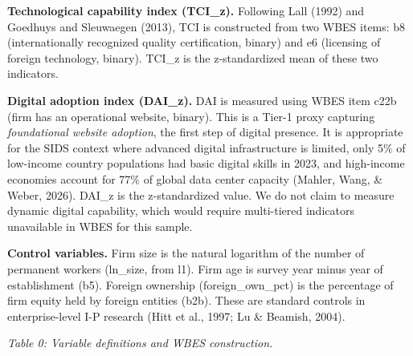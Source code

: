 \documentclass[
  12pt]{article}
\begin{document}
\textbf{Technological capability index (TCI\_z).} Following Lall (1992)
and Goedhuys and Sleuwaegen (2013), TCI is constructed from two WBES
items: b8 (internationally recognized quality certification, binary) and
e6 (licensing of foreign technology, binary). TCI\_z is the
z-standardized mean of these two indicators.

\textbf{Digital adoption index (DAI\_z).} DAI is measured using WBES
item c22b (firm has an operational website, binary). This is a Tier-1
proxy capturing \emph{foundational website adoption}, the first step of
digital presence. It is appropriate for the SIDS context where advanced
digital infrastructure is limited, only 5\% of low-income country
populations had basic digital skills in 2023, and high-income economies
account for 77\% of global data center capacity (Mahler, Wang, \& Weber,
2026). DAI\_z is the z-standardized value. We do not claim to measure
dynamic digital capability, which would require multi-tiered indicators
unavailable in WBES for this sample.

\textbf{Control variables.} Firm size is the natural logarithm of the
number of permanent workers (ln\_size, from l1). Firm age is survey year
minus year of establishment (b5). Foreign ownership (foreign\_own\_pct)
is the percentage of firm equity held by foreign entities (b2b). These
are standard controls in enterprise-level I-P research (Hitt et al.,
1997; Lu \& Beamish, 2004).

\emph{Table 0: Variable definitions and WBES construction.}
\end{document}
